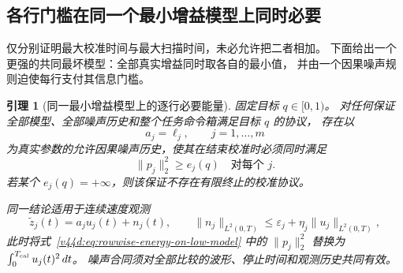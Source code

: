 \documentclass[11pt,a4paper]{article}
\numberwithin{equation}{section}
\newtheorem{lemma}[theorem]{引理}
\theoremstyle{definition}
\begin{document}
\subsection{各行门槛在同一个最小增益模型上同时必要}

仅分别证明最大校准时间与最大扫描时间，未必允许把二者相加。
下面给出一个更强的共同最坏模型：全部真实增益同时取各自的最小值，
并由一个因果噪声规则迫使每行支付其信息门槛。

\begin{lemma}[同一最小增益模型上的逐行必要能量]
\label{v44d:lem:common-low-model}
固定目标 $q\in[0,1)$。
对任何保证全部模型、全部噪声历史和整个任务命令箱满足目标 $q$ 的协议，
存在以
\begin{equation}
 a_j=\ell_j,\qquad j=1,\ldots,m
 \label{v44d:eq:common-low-model}
\end{equation}
为真实参数的允许因果噪声历史，使其在结束校准时必须同时满足
\begin{equation}
 \boxed{\ \|p_j\|_2^2\ge e_j(q)\quad\text{对每个 }j.\ }
 \label{v44d:eq:rowwise-energy-on-low-model}
\end{equation}
若某个 $e_j(q)=+\infty$，则该保证不存在有限终止的校准协议。

同一结论适用于连续速度观测
\begin{equation}
 \widetilde z_j(t)=a_j u_j(t)+n_j(t),\qquad
 \|n_j\|_{L^2(0,T)}
 \le\varepsilon_j+\eta_j\|u_j\|_{L^2(0,T)},
 \label{v44d:eq:continuous-oracle}
\end{equation}
此时将式~\eqref{v44d:eq:rowwise-energy-on-low-model} 中的
$\|p_j\|_2^2$ 替换为 $\int_0^{T_{\rm cal}}u_j(t)^2\,dt$。
噪声合同须对全部比较的波形、停止时间和观测历史共同有效。
\end{lemma}
\end{document}
